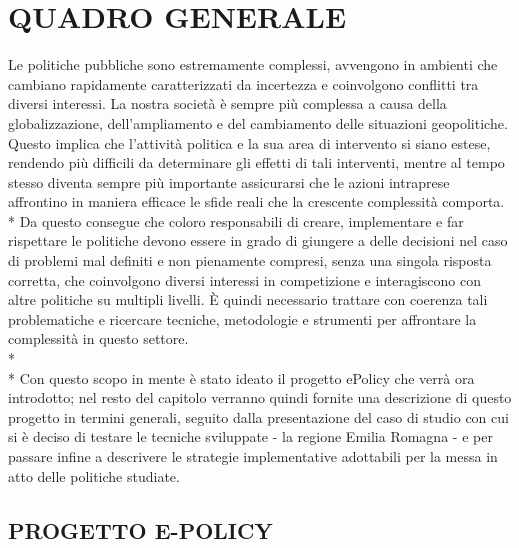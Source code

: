\documentclass[12pt,a4paper,openright,twoside]{report}
\begin{document}
\chapter{\nohyphens{QUADRO GENERALE}}

Le politiche pubbliche sono estremamente complessi, avvengono in ambienti che cambiano rapidamente caratterizzati da incertezza e coinvolgono conflitti tra diversi interessi. La nostra società è sempre più complessa a causa della globalizzazione, dell'ampliamento e del cambiamento delle situazioni geopolitiche. Questo implica che l'attività politica e la sua area di intervento si siano estese, rendendo più difficili da determinare gli effetti di tali interventi, mentre al tempo stesso diventa sempre più importante assicurarsi che le azioni intraprese affrontino in maniera efficace le sfide reali che la crescente complessità comporta.\\*
Da questo consegue che coloro responsabili di creare, implementare e far rispettare le politiche devono essere in grado di giungere a delle decisioni nel caso di problemi mal definiti e non pienamente compresi, senza una singola risposta corretta, che coinvolgono diversi interessi in competizione e interagiscono con altre politiche su multipli livelli. \`E quindi necessario trattare con coerenza tali problematiche e ricercare tecniche, metodologie e strumenti per affrontare la complessità in questo settore.\\*\\*
Con questo scopo in mente è stato ideato il progetto ePolicy che verrà ora introdotto; nel resto del capitolo verranno quindi fornite una descrizione di questo progetto in termini generali, seguito dalla presentazione del caso di studio con cui si è deciso di testare le tecniche sviluppate - la regione Emilia Romagna - e per passare infine a descrivere le strategie implementative adottabili per la messa in atto delle politiche studiate.


\section[E-POLICY]{PROGETTO E-POLICY}
\end{document}
